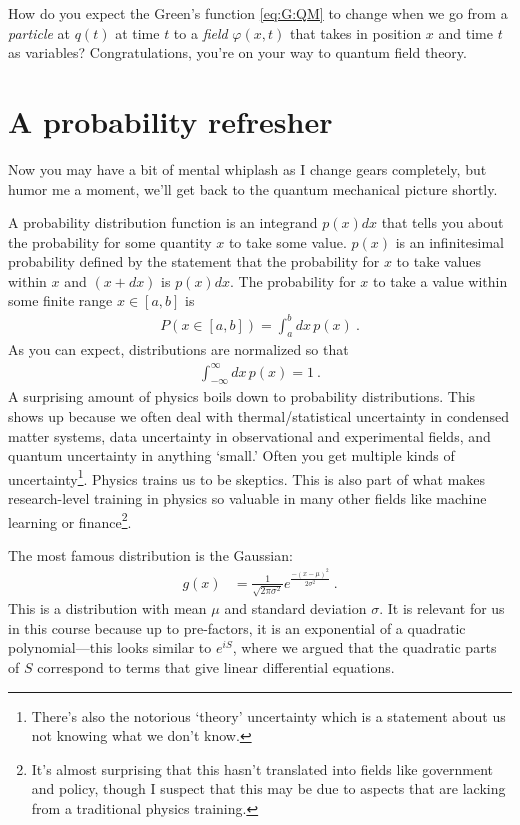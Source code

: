 \begin{exercise}
How do you expect the Green's function \eqref{eq:G:QM} to change when we go from a \emph{particle} at $q(t)$ at time $t$ to a \emph{field} $\varphi(x,t)$ that takes in position $x$ and time $t$ as variables?  Congratulations, you're on your way to quantum field theory. 
\end{exercise}

\section{A probability refresher}

Now you may have a bit of mental whiplash as I change gears completely, but humor me a moment, we'll get back to the quantum mechanical picture shortly. 

A probability distribution function is an integrand $p(x)dx$ that tells you about the probability for some quantity $x$ to take some value. $p(x)$ is an infinitesimal probability defined by the statement that the probability for $x$ to take values within $x$ and $(x+dx)$ is $p(x)dx$. The probability for $x$ to take a value within some finite range $x\in[a,b]$ is
\begin{align}
	P(x\in[a,b]) = \int_a^b dx\, p(x) \ .
\end{align}
As you can expect, distributions are normalized so that
\begin{align}
	\int_{-\infty}^{\infty} dx\, p(x) = 1 \ .
\end{align}
A surprising amount of physics boils down to probability distributions. This shows up because we often deal with thermal/statistical uncertainty in condensed matter systems, data uncertainty in observational and experimental fields, and quantum uncertainty in anything `small.' Often you get multiple kinds of uncertainty\footnote{There's also the notorious `theory' uncertainty which is a statement about us not knowing what we don't know.}. Physics trains us to be skeptics. This is also part of what makes research-level training in physics so valuable in many other fields like machine learning or finance\footnote{It's almost surprising that this hasn't translated into fields like government and policy, though I suspect that this may be due to aspects that are lacking from a traditional physics training.}.

\begin{example}
The most famous distribution is the Gaussian:
\begin{align}
	g(x) &= \frac{1}{\sqrt{2\pi \sigma^2}} e^{\frac{-(x-\mu)^2}{2\sigma^2}} \ .
\end{align}
This is a distribution with mean $\mu$ and standard deviation $\sigma$. It is relevant for us in this course because up to pre-factors, it is an exponential of a quadratic polynomial---this looks similar to $e^{iS}$, where we argued that the quadratic parts of $S$ correspond to terms that give linear differential equations.
\end{example}

